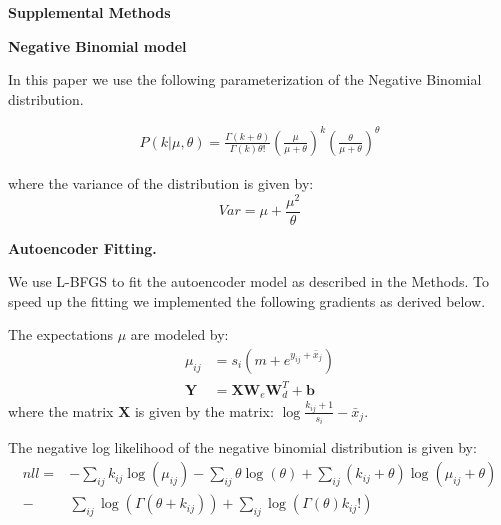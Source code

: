 \documentclass[11pt]{letter}
\newcommand{\matr}[1]{\mathbf{#1}}
\begin{document}
\textbf{Supplemental Methods}

\textbf{Negative Binomial model}

In this paper we use the following parameterization of the Negative Binomial distribution.

\begin{align*}
P(k| \mu, \theta) = \frac{\Gamma(k + \theta)}{\Gamma(k) \theta!}  
\left ( \frac{\mu}{\mu + \theta} \right )^{k}
\left ( \frac{\theta}{\mu + \theta} \right)^{\theta} 
\end{align*}

where the variance of the distribution is given by:
\[
Var = \mu + \frac{\mu^2}{\theta}
\]


% 
% 
% 
% 





\textbf{Autoencoder Fitting.}

We use L-BFGS to fit the autoencoder model as described in the Methods.
To speed up the fitting we implemented the following gradients as derived below.

The expectations $\mu$ are modeled by:
\begin{align*}
\mu_{ij} &= s_{i}(m + e^{y_{ij} + \bar{x}_j})\\
\matr{Y} &= \matr{X} \matr{W}_e \matr{W}_d^T + \matr{b}
\end{align*}
where the matrix $\matr{X}$ is given by the matrix: $\log{\frac{k_{ij}+1}{s_i}} - \bar{x}_j$. 


The negative log likelihood of the negative binomial distribution is given by:
\begin{align*}
nll=& -\sum_{ij} k_{ij} \log{(\mu_{ij})} - 
\sum_{ij} \theta \log{(\theta)} +
\sum_{ij} (k_{ij} + \theta) \log{(\mu_{ij} + \theta)} \\
-&\sum_{ij} \log{(\Gamma(\theta + k_{ij}))} 
+ \sum_{ij} \log{(\Gamma({\theta}) k_{ij}!)}
\end{align*}
\end{document}
